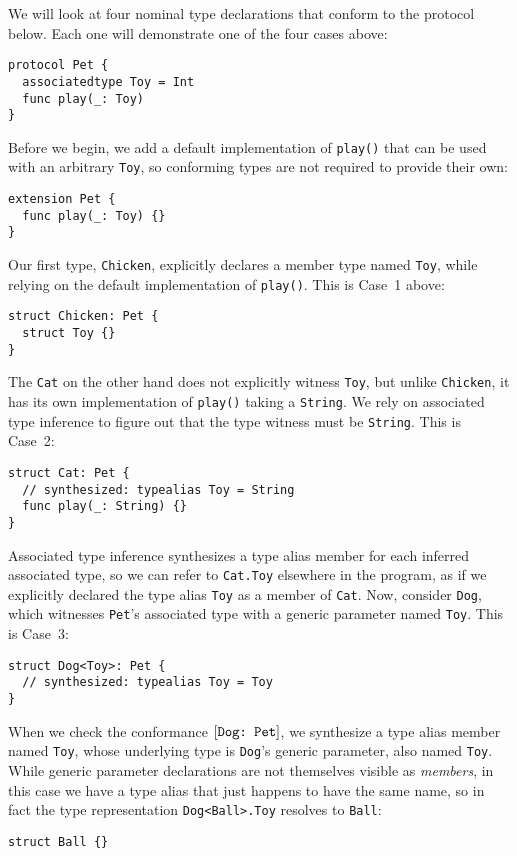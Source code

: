\documentclass[../generics]{subfiles}
\begin{document}
\begin{example}\label{type witness example}
We will look at four nominal type declarations that conform to the protocol below. Each one will demonstrate one of the four cases above:
\begin{Verbatim}
protocol Pet {
  associatedtype Toy = Int
  func play(_: Toy)
}
\end{Verbatim}
Before we begin, we add a default implementation of \texttt{play()} that can be used with an arbitrary \texttt{Toy}, so conforming types are not required to provide their own:
\begin{Verbatim}
extension Pet {
  func play(_: Toy) {}
}
\end{Verbatim}
Our first type, \texttt{Chicken}, explicitly declares a member type named \texttt{Toy}, while relying on the default implementation of \texttt{play()}. This is Case~1 above:
\begin{Verbatim}
struct Chicken: Pet {
  struct Toy {}
}
\end{Verbatim}
The \texttt{Cat} on the other hand does not explicitly witness \texttt{Toy}, but unlike \texttt{Chicken}, it has its own implementation of \texttt{play()} taking a \texttt{String}. We rely on associated type inference to figure out that the type witness must be \texttt{String}. This is Case~2:
\begin{Verbatim}
struct Cat: Pet {
  // synthesized: typealias Toy = String
  func play(_: String) {}
}
\end{Verbatim}
Associated type inference synthesizes a type alias member for each inferred associated type, so we can refer to \texttt{Cat.Toy} elsewhere in the program, as if we explicitly declared the type alias \texttt{Toy} as a member of \texttt{Cat}. Now, consider \texttt{Dog}, which witnesses \texttt{Pet}'s associated type with a generic parameter named \texttt{Toy}. This is Case~3:
\begin{Verbatim}
struct Dog<Toy>: Pet {
  // synthesized: typealias Toy = Toy
}
\end{Verbatim}
When we check the conformance $[\texttt{Dog:~Pet}]$, we synthesize a type alias member named \texttt{Toy}, whose underlying type is \texttt{Dog}'s generic parameter, also named \texttt{Toy}. While generic parameter declarations are not themselves visible as \emph{members}, in this case we have a type alias that just happens to have the same name, so in fact the type representation \texttt{Dog<Ball>.Toy} resolves to \texttt{Ball}:
\begin{Verbatim}
struct Ball {}


\end{Verbatim}
\end{example}
\end{document}

